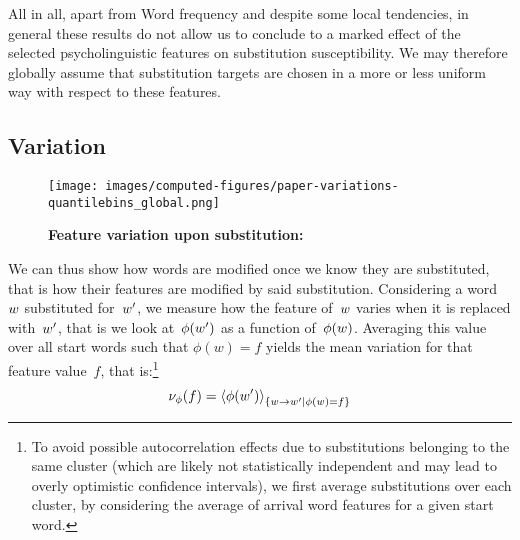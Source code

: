 All in all, apart from Word frequency and despite some local tendencies, {in general} these results do not allow us to conclude to a marked effect %
of the selected psycholinguistic features on substitution susceptibility.
We may therefore globally assume that substitution targets are chosen in a more or less uniform way with respect to these features.

\subsection{Variation}

\begin{figure*}[!th]
    \centering
    \texttt{[image: images/computed-figures/paper-variations-quantilebins\_global.png]}
    \caption{\textbf{Feature variation upon substitution:} %
    }
    \label{fig:feature-variations-global}
\end{figure*}

We can thus show how words are modified once we know they are substituted, that is how their features are modified by said substitution.
Considering a word~$w$ substituted for~$w'$, we measure how the feature of~$w$ varies when it is replaced with~$w'$, that is we look at~$\phi(w')$ as a function of~$\phi(w)$.
Averaging this value over all start words such that $\phi(w) = f$ yields the mean variation for that feature value~$f$, that is:\footnote{To avoid possible autocorrelation effects due to substitutions belonging to the same cluster (which are likely not statistically independent and may lead to overly optimistic confidence intervals), we first average substitutions over each cluster, by considering the average of arrival word features for a given start word.}
$$\nu_{\phi}(f) = \left<\phi(w')\right>_{\left\lbrace w\rightarrow w' | \phi(w) = f \right\rbrace}$$


